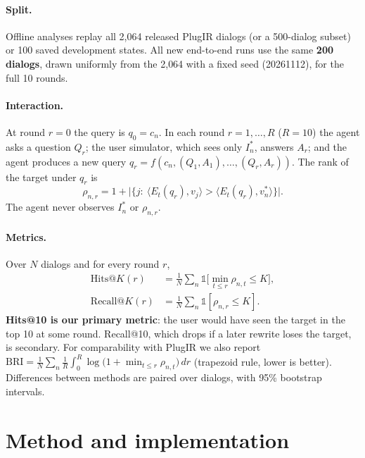 \documentclass[sigconf,nonacm]{acmart}
\begin{document}
\paragraph{Split.} Offline analyses replay all 2{,}064 released PlugIR dialogs (or a 500-dialog
subset) or 100 saved development states. All new end-to-end runs use the same \textbf{200
dialogs}, drawn uniformly from the 2{,}064 with a fixed seed (20261112), for the full 10 rounds.

\paragraph{Interaction.} At round $r=0$ the query is $q_0=c_n$. In each round $r=1,\dots,R$
($R=10$) the agent asks a question $Q_r$; the user simulator, which sees only $I^*_n$, answers
$A_r$; and the agent produces a new query $q_r=f(c_n,(Q_1,A_1),\dots,(Q_r,A_r))$. The rank of the
target under $q_r$ is
\begin{equation}
\rho_{n,r}=1+\big|\{j:\ \langle E_t(q_r),v_j\rangle>\langle E_t(q_r),v^*_n\rangle\}\big|.
\end{equation}
The agent never observes $I^*_n$ or $\rho_{n,r}$.

\paragraph{Metrics.} Over $N$ dialogs and for every round $r$,
\begin{align}
\text{Hits@}K(r)&=\tfrac{1}{N}\textstyle\sum_n \mathbb{1}\big[\min_{t\le r}\rho_{n,t}\le K\big],\\
\text{Recall@}K(r)&=\tfrac{1}{N}\textstyle\sum_n \mathbb{1}[\rho_{n,r}\le K].
\end{align}
\textbf{Hits@10 is our primary metric}: the user would have seen the target in the top 10 at some
round. Recall@10, which drops if a later rewrite loses the target, is secondary. For comparability
with PlugIR we also report
$\text{BRI}=\frac{1}{N}\sum_n \frac{1}{R}\int_0^R \log\big(1+\min_{t\le r}\rho_{n,t}\big)\,dr$
(trapezoid rule, lower is better). Differences between methods are paired over dialogs, with 95\%
bootstrap intervals.

\section{Method and implementation}
\label{sec:method}
\end{document}
